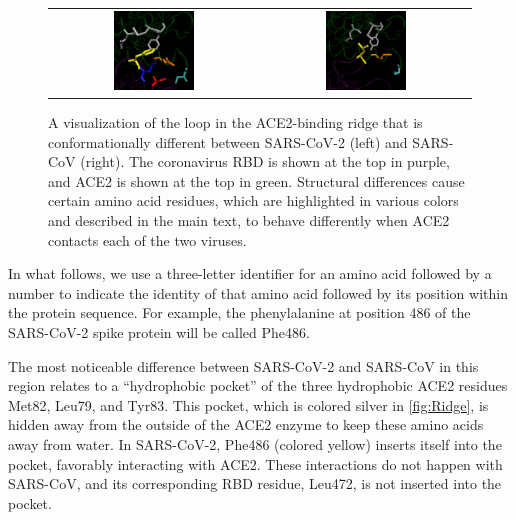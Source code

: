 \begin{figure}[h]
	\centering
	\mySfFamily
	\begin{tabular}{c c}
	\includegraphics[width = 0.4\textwidth]{../images/Ridge_SARS-2.png} & \includegraphics[width = 0.4\textwidth]{../images/Ridge_SARS.png}
	\end{tabular}
	\caption{A visualization of the loop in the ACE2-binding ridge that is conformationally different between SARS-CoV-2 (left) and SARS-CoV (right). The coronavirus RBD is shown at the top in purple, and ACE2 is shown at the top in green. Structural differences cause certain amino acid residues, which are highlighted in various colors and described in the main text, to behave differently when ACE2 contacts each of the two viruses.}
	\label{fig:Ridge}
\end{figure}

In what follows, we use a three-letter identifier for an amino acid followed by a number to indicate the identity of that amino acid followed by its position within the protein sequence. For example, the phenylalanine at position 486 of the SARS-CoV-2 spike protein will be called Phe486.

The most noticeable difference between SARS-CoV-2 and SARS-CoV in this region relates to a ``hydrophobic pocket'' of the three hydrophobic ACE2 residues Met82, Leu79, and Tyr83. This pocket, which is colored silver in \autoref{fig:Ridge}, is hidden away from the outside of the ACE2 enzyme to keep these amino acids away from water. In SARS-CoV-2, Phe486 (colored yellow) inserts itself into the pocket, favorably interacting with ACE2. These interactions do not happen with SARS-CoV, and its corresponding RBD residue, Leu472, is not inserted into the pocket.

